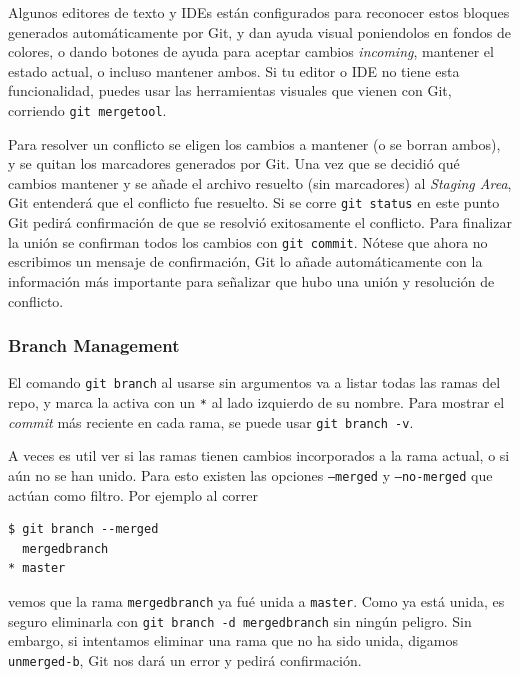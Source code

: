 Algunos editores de texto y IDEs están configurados para reconocer estos
bloques generados automáticamente por Git, y dan ayuda visual
poniendolos en fondos de colores, o dando botones de ayuda para aceptar
cambios \emph{incoming}, mantener el estado actual, o incluso mantener
ambos. Si tu editor o IDE no tiene esta funcionalidad, puedes usar las
herramientas visuales que vienen con Git, corriendo
\passthrough{\lstinline!git mergetool!}.

Para resolver un conflicto se eligen los cambios a mantener (o se borran
ambos), y se quitan los marcadores generados por Git. Una vez que se
decidió qué cambios mantener y se añade el archivo resuelto (sin
marcadores) al \emph{Staging Area}, Git entenderá que el conflicto fue
resuelto. Si se corre \passthrough{\lstinline!git status!} en este punto
Git pedirá confirmación de que se resolvió exitosamente el conflicto.
Para finalizar la unión se confirman todos los cambios con
\passthrough{\lstinline!git commit!}. Nótese que ahora no escribimos un
mensaje de confirmación, Git lo añade automáticamente con la información
más importante para señalizar que hubo una unión y resolución de
conflicto.

\subsubsection{Branch Management}

El comando \passthrough{\lstinline!git branch!} al usarse sin argumentos
va a listar todas las ramas del repo, y marca la activa con un
\passthrough{\lstinline!*!} al lado izquierdo de su nombre. Para mostrar
el \emph{commit} más reciente en cada rama, se puede usar
\passthrough{\lstinline!git branch -v!}.

A veces es util ver si las ramas tienen cambios incorporados a la rama
actual, o si aún no se han unido. Para esto existen las opciones
\passthrough{\lstinline!–merged!} y \passthrough{\lstinline!–no-merged!}
que actúan como filtro. Por ejemplo al correr

\begin{lstlisting}
$ git branch --merged
  mergedbranch
* master
\end{lstlisting}

vemos que la rama \passthrough{\lstinline!mergedbranch!} ya fué unida a
\passthrough{\lstinline!master!}. Como ya está unida, es seguro
eliminarla con \passthrough{\lstinline!git branch -d mergedbranch!} sin
ningún peligro. Sin embargo, si intentamos eliminar una rama que no ha
sido unida, digamos \passthrough{\lstinline!unmerged-b!}, Git nos dará
un error y pedirá confirmación.


